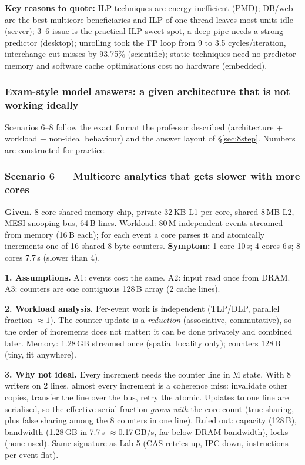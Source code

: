 \textbf{Key reasons to quote:} ILP techniques are energy-inefficient (PMD); DB/web are the best multicore beneficiaries and ILP of one thread leaves most units idle (server); 3--6 issue is the practical ILP sweet spot, a deep pipe needs a strong predictor (desktop); unrolling took the FP loop from 9 to 3.5 cycles/iteration, interchange cut misses by 93.75\% (scientific); static techniques need no predictor memory and software cache optimisations cost no hardware (embedded).
\subsubsection*{Exam-style model answers: a given architecture that is not working ideally}
Scenarios 6--8 follow the exact format the professor described (architecture + workload + non-ideal behaviour) and the answer layout of \S\ref{sec:8step}. Numbers are constructed for practice.

\subsubsection*{Scenario 6 --- Multicore analytics that gets slower with more cores}
\textbf{Given.} 8-core shared-memory chip, private 32\,KB L1 per core, shared 8\,MB L2, MESI snooping bus, 64\,B lines. Workload: 80\,M independent events streamed from memory (16\,B each); for each event a core parses it and atomically increments one of 16 shared 8-byte counters. \textbf{Symptom:} 1 core 10\,s; 4 cores 6\,s; 8 cores 7.7\,s (slower than 4).

\textbf{1. Assumptions.} A1: events cost the same. A2: input read once from DRAM. A3: counters are one contiguous 128\,B array (2 cache lines).

\textbf{2. Workload analysis.} Per-event work is independent (TLP/DLP, parallel fraction $\approx1$). The counter update is a \emph{reduction} (associative, commutative), so the order of increments does not matter: it can be done privately and combined later. Memory: 1.28\,GB streamed once (spatial locality only); counters 128\,B (tiny, fit anywhere).

\textbf{3. Why not ideal.} Every increment needs the counter line in M state. With 8 writers on 2 lines, almost every increment is a coherence miss: invalidate other copies, transfer the line over the bus, retry the atomic. Updates to one line are serialised, so the effective serial fraction \emph{grows with} the core count (true sharing, plus false sharing among the 8 counters in one line). Ruled out: capacity (128\,B), bandwidth (1.28\,GB in 7.7\,s $\approx$0.17\,GB/s, far below DRAM bandwidth), locks (none used). Same signature as Lab 5 (CAS retries up, IPC down, instructions per event flat).

